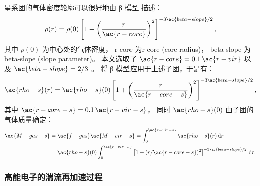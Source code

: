 星系团的气体密度轮廓可以很好地由 β 模型 \cite{cavaliere1976} 描述：
\begin{equation}
  \label{eq:beta-model}
  \rho(r)
    = \rho(0) \left[ 1 + \left(
      \frac{r}{\ac{r-core}} \right)^2 \right]^{-3\ac{beta-slope}/2} ,
\end{equation}
其中
$\rho(0)$ 为中心处的气体密度，
\ac{r-core} 为\acl{r-core} (core radius)，
\ac{beta-slope} 为\acl{beta-slope} (slope parameter)。
本文选取了 $\ac{r-core} = 0.1 \,\ac{r-vir}$ \cite{sanderson2003}
以及 $\ac{beta-slope} = 2/3$ \cite{jones1984}。
将 β 模型应用于上述子团，于是有：
\begin{equation}
  \ac{rho-s}(r)
    = \ac{rho-s}(0) \left[ 1 + \left(
      \frac{r}{\ac{r-core-s}} \right)^2 \right]^{-3\ac{beta-slope}/2} ,
\end{equation}
其中
$\ac{r-core-s} = 0.1 \,\ac{r-vir-s}$，
同时 $\ac{rho-s}(0)$ 由子团的气体质量确定：
\begin{align}
  \ac{M-gas-s}
    & = \ac{f-gas} \ac{M-vir-s}
      = \int_0^{\ac{r-vir-s}} \ac{rho-s}(r) \,\D{r}  \\
    & = \ac{rho-s}(0) \int_0^{\ac{r-vir-s}}
        \left[ 1 + (r / \ac{r-core-s})^2 \right]^{-3\ac{beta-slope}/2}
        \,\D{r} .
\end{align}

\subsubsection{高能电子的湍流再加速过程}

